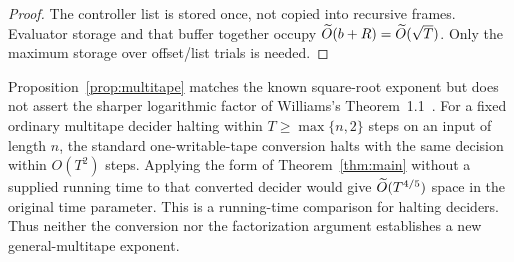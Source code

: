 \begin{proof}
The controller list is stored once, not copied into recursive
frames. Evaluator storage and that buffer together occupy
\(\widetilde O(b+R)=\widetilde O(\sqrt T)\).
Only the maximum storage over offset/list trials is needed.
\end{proof}

Proposition~\ref{prop:multitape} matches the known square-root
exponent but does not assert the sharper logarithmic factor of
Williams's Theorem~1.1~\cite{Williams2025}.
For a fixed ordinary multitape decider halting within
\(T\ge\max\{n,2\}\) steps on an input of length \(n\), the standard
one-writable-tape conversion halts with the same decision within
\(O(T^2)\) steps. Applying the form of Theorem~\ref{thm:main} without
a supplied running time to that converted decider would give
\(\widetilde O(T^{4/5})\) space in the original time parameter.
This is a running-time comparison for halting deciders.
Thus neither the conversion nor the factorization argument
establishes a new general-multitape exponent.
